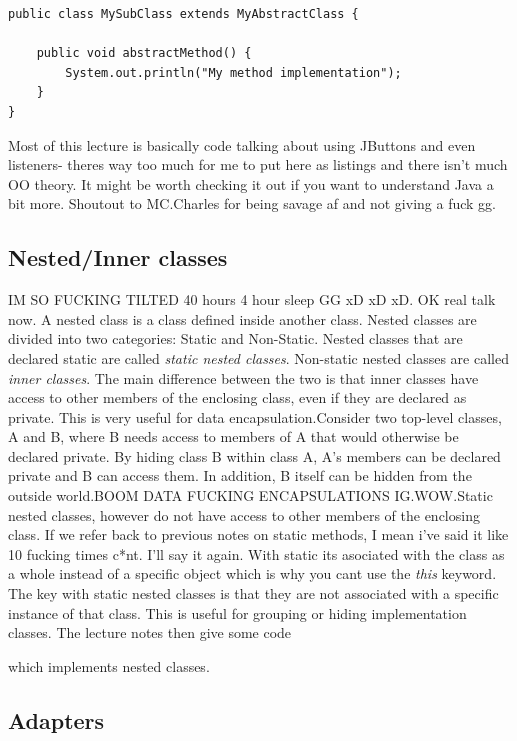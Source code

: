 \documentclass{article}
\begin{document}
\begin{lstlisting}
public class MySubClass extends MyAbstractClass {

    public void abstractMethod() {
        System.out.println("My method implementation");
    }
}
\end{lstlisting}

Most of this lecture is basically code talking about using JButtons and even listeners- theres way too much
for me to put here as listings and there isn't much OO theory. It might be worth checking it out if you want
to understand Java a bit more. Shoutout to MC.Charles for being savage af and not giving a fuck gg.

\subsection{Nested/Inner classes}

IM SO FUCKING TILTED 40 hours 4 hour sleep GG xD xD xD. OK real talk now.
\newline
A nested class is a class defined inside another class. Nested classes are divided into two categories: Static
and Non-Static. Nested classes that are declared static are called \emph{static nested classes}. Non-static
nested classes are called \emph{inner classes}. The main difference between the two is that inner classes have
access to other members of the enclosing class, even  if they are declared as private. This is very useful for data encapsulation.Consider two top-level classes, A and B, where B needs access to members of A that would otherwise be declared private. By hiding class B within class A, A's members can be declared private and B can access them. In addition, B itself can be hidden from the outside world.BOOM DATA FUCKING ENCAPSULATIONS IG.WOW.Static nested classes,
however do not have access to other members of the enclosing class. If we refer back to previous notes
on static methods, I mean i've said it like 10 fucking times c*nt. I'll say it again. With static its 
asociated with the class as a whole instead of a specific object which is why you cant use the \emph{this}
keyword. The key with static nested classes is that they are not associated with a specific instance of 
that class. This is useful for grouping or hiding implementation classes. The lecture notes then give some code

which implements nested classes.

\subsection{Adapters}
\end{document}
